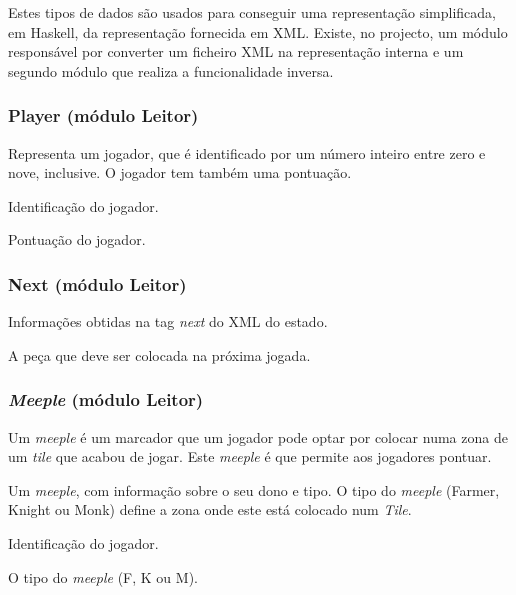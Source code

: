 \documentclass[11pt, a4paper, twoside]{article}
\begin{document}
Estes tipos de dados são usados para conseguir uma representação simplificada, em Haskell, da representação fornecida em XML. Existe, no projecto, um módulo responsável por converter um ficheiro XML na representação interna e um segundo módulo que realiza a funcionalidade inversa.

\subsubsection[Player]{Player (módulo Leitor)}

Representa um jogador, que é identificado por um número inteiro entre zero e nove, inclusive. O jogador tem também uma pontuação.

\begin{description}[style=multiline,leftmargin=3cm,font=\bfseries]
    \item[s\_player::Int] Identificação do jogador.
    \item[s\_score::Int] Pontuação do jogador.
\end{description}

\subsubsection[Next]{Next (módulo Leitor)}

Informações obtidas na tag \textit{next} do XML do estado.

\begin{description}[style=multiline,leftmargin=2.5cm,font=\bfseries]
    \item[n\_tile::Char] A peça que deve ser colocada na próxima jogada.
\end{description}

\subsubsection[Meeple]{\textit{Meeple} (módulo Leitor)}

Um \textit{meeple} é um marcador que um jogador pode optar por colocar numa zona de um \textit{tile} que acabou de jogar. Este \textit{meeple} é que permite aos jogadores pontuar.

Um \textit{meeple}, com informação sobre o seu dono e tipo. O tipo do \textit{meeple} (Farmer, Knight ou Monk) define a zona onde este está colocado num \textit{Tile}.

\begin{description}[style=multiline,leftmargin=3cm,font=\bfseries]
    \item[m\_player::Int] Identificação do jogador.
    \item[m\_type::Char] O tipo do \textit{meeple} (F, K ou M).
\end{description}
\end{document}
